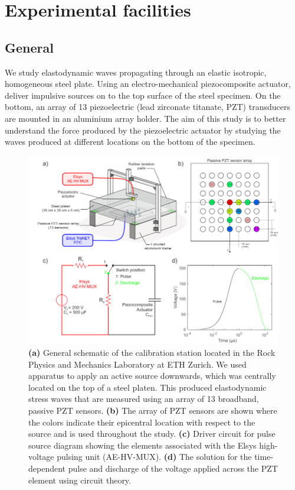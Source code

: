 \documentclass[preprint,3p, 11pt,authoryear]{elsarticle}
\begin{document}
\section{Experimental facilities}
\subsection{General}

We study elastodynamic waves propagating through an elastic isotropic, homogeneous steel plate. Using an electro-mechanical piezocomposite actuator, deliver impulsive sources on to the top surface of the steel specimen. On the bottom, an array of 13 piezoelectric (lead zirconate titanate, PZT) transducers are mounted in an aluminium array holder. The aim of this study is to better understand the force produced by the piezoelectric actuator by studying the waves produced at different locations on the bottom of the specimen.

\begin{figure}[ht]
     	\centering
\includegraphics[scale= 1.0]{FIG1.pdf} 
\caption{\textbf{(a)} General schematic of the calibration station located in the Rock Physics and Mechanics Laboratory at ETH Zurich. We used apparatus to apply an active source downwards, which was centrally located on the top of a steel platen. This produced elastodynamic stress waves that are measured using an array of 13 broadband, passive PZT sensors. \textbf{(b)} The array of PZT sensors are shown where the colors indicate their epicentral location with respect to the source and is used throughout the study. \textbf{(c)} Driver circuit for pulse source diagram showing the elements associated with the Elsys high-voltage pulsing unit (AE-HV-MUX). \textbf{(d)} The solution for the time-dependent pulse and discharge of the voltage applied across the PZT element using circuit theory. }
	\label{fig1} 
\end{figure}
\end{document}
